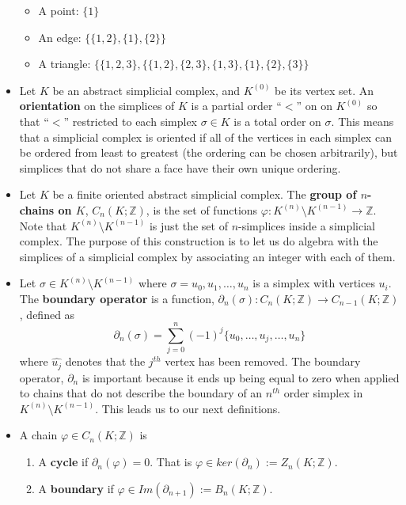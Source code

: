\documentclass[a4paper,12pt]{report}
\begin{document}
\begin{itemize}
\begin{itemize}
  \item A point: $\{1\}$
  \item An edge: $\{\{1,2\},\{1\},\{2\}\}$
  \item A triangle: $\{\{1,2,3\},\{\{1,2\},\{2,3\},\{1,3\},\{1\},\{2\},\{3\}\}$
\end{itemize}
\item Let $K$ be an abstract simplicial complex, and $K^{(0)}$ be its vertex set. An \textbf{orientation}  on the simplices of $K$ is a partial order ``$<$'' on on $K^{(0)}$ so that ``$<$'' restricted to each simplex $\sigma\in K$ is a total order on $\sigma$. This means that a simplicial complex is oriented if all of the vertices in each simplex can be ordered from least to greatest (the ordering can be chosen arbitrarily), but simplices that do not share a face have their own unique ordering. 
\item Let $K$ be a finite oriented abstract simplicial complex. The \textbf{group of $n$-chains on $K$}, $C_n(K;\mathbb{Z})$, is the set of functions $\varphi:K^{(n)}\setminus K^{(n-1)}\rightarrow \mathbb{Z}$. Note that $K^{(n)}\setminus K^{(n-1)}$ is just the set of $n$-simplices inside a simplicial complex. The purpose of this construction is to let us do algebra with the simplices of a simplicial complex by associating an integer with each of them.
\item Let $\sigma\in K^{(n)}\setminus K^{(n-1)}$ where $\sigma = {u_0,u_1,\ldots,u_n}$ is a simplex with vertices $u_i$. The \textbf{boundary operator} is a function, $\partial_n(\sigma):C_n(K;\mathbb{Z})\rightarrow C_{n-1}(K;\mathbb{Z})$, defined as
\[
 \partial_n(\sigma) = \sum_{j=0}^{n} (-1)^j \{u_0,\ldots,\hat{u_j},\ldots,u_n\}
\]
where $\hat{u_j}$ denotes that the $j^{th}$ vertex has been removed. The boundary operator, $\partial_n$ is important because it ends up being equal to zero when applied to chains that do not describe the boundary of an $n^{th}$ order simplex in  $K^{(n)}\setminus K^{(n-1)}$. This leads us to our next definitions.
\item A chain $\varphi\in C_n(K;\mathbb{Z})$ is
\begin{enumerate}
 \item A \textbf{cycle} if $\partial_n(\varphi) = 0$. That is $\varphi\in ker(\partial_n) := Z_n(K;\mathbb{Z})$.
 \item A \textbf{boundary} if $\varphi\in Im(\partial_{n+1}):=B_n(K;\mathbb{Z})$.
\end{enumerate}
\end{itemize}
\end{document}
